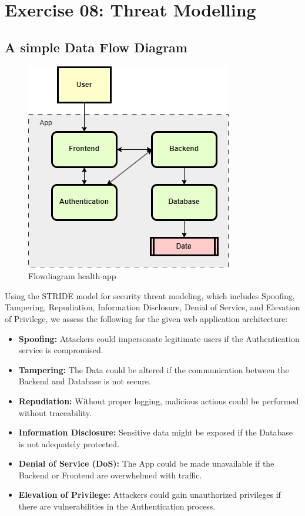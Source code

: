 \section{Exercise 08: Threat Modelling}

\subsection{A simple Data Flow Diagram}

\begin{figure}[H]
    \centering
    \includegraphics[width=0.5\linewidth]{pic/Flowdiagram.png}
    \caption{Flowdiagram health-app}
    \label{fig:Flowdiagram health-app}
\end{figure}

Using the STRIDE model for security threat modeling, which includes Spoofing, Tampering, Repudiation, Information Disclosure, Denial of Service, and Elevation of Privilege, we assess the following for the given web application architecture:

\begin{itemize}
    \item \textbf{Spoofing:} Attackers could impersonate legitimate users if the Authentication service is compromised.
    \item \textbf{Tampering:} The Data could be altered if the communication between the Backend and Database is not secure.
    \item \textbf{Repudiation:} Without proper logging, malicious actions could be performed without traceability.
    \item \textbf{Information Disclosure:} Sensitive data might be exposed if the Database is not adequately protected.
    \item \textbf{Denial of Service (DoS):} The App could be made unavailable if the Backend or Frontend are overwhelmed with traffic.
    \item \textbf{Elevation of Privilege:} Attackers could gain unauthorized privileges if there are vulnerabilities in the Authentication process.
\end{itemize}

